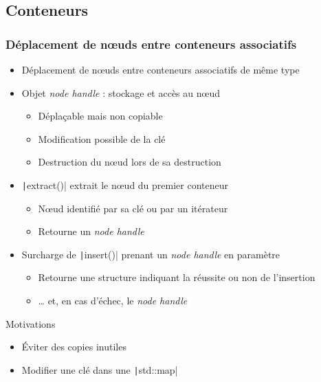 \documentclass[C++.tex]{subfiles}
\begin{document}
\subsection*{Conteneurs}
\begin{frame}[fragile]
	\frametitle{Déplacement de nœuds entre conteneurs associatifs}
	\begin{itemize}
		\item Déplacement de nœuds entre conteneurs associatifs de même type
		\item Objet \textit{node handle} : stockage et accès au nœud
		\begin{itemize}
			\item Déplaçable mais non copiable
			\item Modification possible de la clé
			\item Destruction du nœud lors de sa destruction
		\end{itemize}
		\item \texttt|extract()| extrait le nœud du premier conteneur
		\begin{itemize}
			\item Nœud identifié par sa clé ou par un itérateur
			\item Retourne un \textit{node handle}
		\end{itemize}
		\item Surcharge de \texttt|insert()| prenant un \textit{node handle} en paramètre
		\begin{itemize}
			\item Retourne une structure indiquant la réussite ou non de l'insertion
			\item \ldots{} et, en cas d'échec, le \textit{node handle}
		\end{itemize}
	\end{itemize}

	\begin{block}{Motivations}
		\begin{itemize}
			\item Éviter des copies inutiles
			\item Modifier une clé dans une \texttt|std::map|
		\end{itemize}
	\end{block}

\end{frame}
\end{document}
